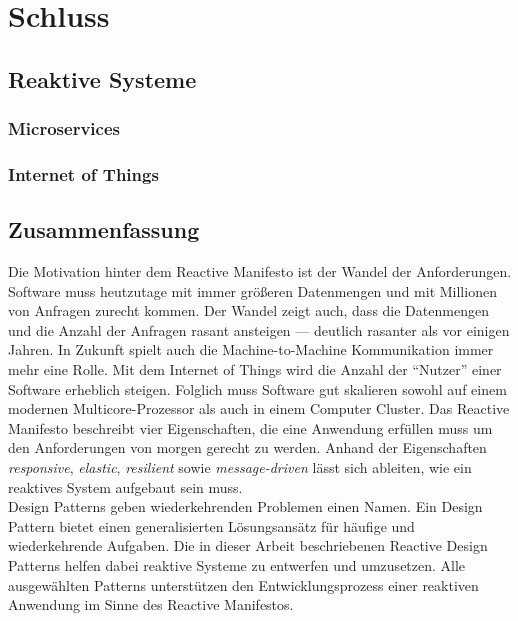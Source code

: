 \chapter{Schluss}

\section{Reaktive Systeme}
\subsection{Microservices}
\subsection{Internet of Things}

\section{Zusammenfassung}
Die Motivation hinter dem Reactive Manifesto ist der Wandel der Anforderungen. Software muss heutzutage mit immer größeren Datenmengen und mit Millionen von Anfragen zurecht kommen. Der Wandel zeigt auch, dass die Datenmengen und die Anzahl der Anfragen rasant ansteigen --- deutlich rasanter als vor einigen Jahren. In Zukunft spielt auch die Machine-to-Machine Kommunikation immer mehr eine Rolle. Mit dem Internet of Things wird die Anzahl der \enquote{Nutzer} einer Software erheblich steigen. Folglich muss Software gut skalieren sowohl auf einem modernen Multicore-Prozessor als auch in einem Computer Cluster. Das Reactive Manifesto beschreibt vier Eigenschaften, die eine Anwendung erfüllen muss um den Anforderungen von morgen gerecht zu werden. Anhand der Eigenschaften \textit{responsive}, \textit{elastic}, \textit{resilient} sowie \textit{message-driven} lässt sich ableiten, wie ein reaktives System aufgebaut sein muss.\\
Design Patterns geben wiederkehrenden Problemen einen Namen. Ein Design Pattern bietet einen generalisierten Lösungsansätz für häufige und wiederkehrende Aufgaben. Die in dieser Arbeit beschriebenen Reactive Design Patterns helfen dabei reaktive Systeme zu entwerfen und umzusetzen. Alle ausgewählten Patterns unterstützen den Entwicklungsprozess einer reaktiven Anwendung im Sinne des Reactive Manifestos.\\
